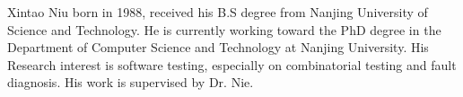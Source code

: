 \documentclass[10pt,journal,compsoc]{IEEEtran}
\begin{document}





%
%
%

%

\begin{IEEEbiography}{Xintao Niu}
born in 1988, received his B.S degree from Nanjing University of Science and Technology. He is currently
working toward the PhD degree in the Department of Computer Science and Technology at
Nanjing University. His Research interest is software testing, especially on combinatorial testing and fault diagnosis. His work is supervised by Dr. Nie.
\end{IEEEbiography}
\end{document}
